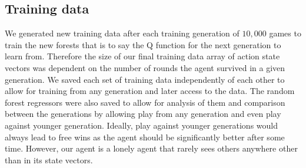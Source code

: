 	\subsection{Training data}
	We generated new training data after each training generation of $10,000$ games to train the new forests that is to say the Q function for the next generation to learn from. Therefore the size of our final training data array of action state vectors was dependent on the number of rounds the agent survived in a given generation. We saved each set of training data independently of each other to allow for training from any generation and later access to the data. The random forest regressors were also saved to allow for analysis of them and comparison between the generations by allowing play from any generation and even play against younger generation. Ideally, play against younger generations would always lead to free wins as the agent should be significantly better after some time. However, our agent is a lonely agent that rarely sees others anywhere other than in its state vectors.
